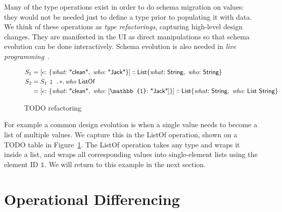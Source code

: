 \documentclass[english,submission]{programming}
\theoremstyle{definition}
\DeclareMathOperator{\exec}{\ \fatsemi\ \ }
\newcommand{\is}{{:}\ }
\newcommand{\comma}{,\ }
\newcommand{\isa}{\dblcolon}
\newcommand{\quotedstring}[1]{\textsf{\textquotedbl{#1}\textquotedbl}}
\begin{document}
Many of the type operations exist in order to do schema migration on values: they would not be needed just to define a type prior to populating it with data. We think of these operations as \textit{type refactorings}, capturing high-level design changes. They are manifested in the UI as direct manipulations so that schema evolution can be done interactively. Schema evolution is also needed in \textit{live programming}~\cite{challenge-problems}.
\begin{figure}[h]
\begin{align*}
  S_1 &= [
    e \is \{ \mathit{what}\is \quotedstring{clean}\comma  \mathit{who}\is \quotedstring{Jack} \}
    ] \isa
    \textsf{List}\{ \mathit{what}\is \textsf{String}\comma \mathit{who}\is \textsf{String} \}\\
S_2 &= S_1 \exec \ldotp *\ldotp \mathit{who} \textsf{ ListOf } \\
 &= [
    e \is \{ \mathit{what}\is \quotedstring{clean}\comma  \mathit{who}\is [\mathbb{1}\is \quotedstring{Jack}] \}
    ] \isa
    \textsf{List}\{ \mathit{what}\is \textsf{String}\comma  \mathit{who}\is \textsf{List String} \}\\
\end{align*}
\vspace{-40pt}
\caption{TODO refactoring}
\label{fig:TODO-refactor}
\end{figure}

For example a common design evolution is when a single value needs to become a list of multiple values. We capture this in the \textsf{ListOf} operation, shown on a TODO table in Figure~\ref{fig:TODO-refactor}.
The \textsf{ListOf} operation takes any type and wraps it inside a list, and wraps all corresponding values into single-element lists using the element ID $\mathbb{1}$. We will return to this example in the next section.




\section{Operational Differencing}
\end{document}
